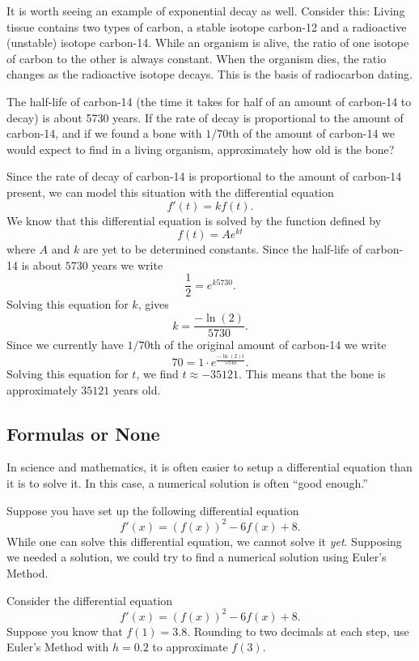 It is worth seeing an example of exponential decay as well. Consider
this: Living tissue contains two types of carbon, a stable
isotope carbon-12 and a radioactive (unstable) isotope
carbon-14. While an organism is alive, the ratio of one isotope of
carbon to the other is always constant. When the organism dies, the
ratio changes as the radioactive isotope decays. This is the basis of
radiocarbon dating.


\begin{example}
The half-life of carbon-14 (the time it takes for half of an amount of
carbon-14 to decay) is about 5730 years. If the rate of decay is
proportional to the amount of carbon-14, and if we found a bone with
$1/70$th of the amount of carbon-14 we would expect to find in a living
organism, approximately how old is the bone?
\end{example}

\begin{solution}
Since the rate of decay of carbon-14 is proportional to the amount of
carbon-14 present, we can model this situation with the differential
equation
\[
f'(t) = k f(t).
\]
We know that this differential equation is solved by the function
defined by
\[
f(t) = A e^{kt}
\]
where $A$ and $k$ are yet to be determined constants. Since the
half-life of carbon-14 is about $5730$ years we write
\[
\frac{1}{2} = e^{k 5730}.
\]
Solving this equation for $k$, gives
\[
k = \frac{-\ln(2)}{5730}.
\]
Since we currently have $1/70$th of the original amount of carbon-14
we write
\[
70 = 1\cdot e^{\frac{-\ln(2)t}{5730}}.
\]
Solving this equation for $t$, we find $t \approx -35121$. This means
that the bone is approximately $35121$ years old.
\end{solution}


\subsection*{Formulas or None}

In science and mathematics, it is often easier to setup a differential
equation than it is to solve it. In this case, a numerical
solution is often ``good enough.''

Suppose you have set up the following differential equation
\[
f'(x) = \left(f(x)\right)^2 - 6f(x) + 8.
\]
While one can solve this differential equation, we cannot solve it
\textit{yet}. Supposing we needed a solution, we could try to find a
numerical solution using Euler's Method.

\begin{example}\label{example:slopefield1}
Consider the differential equation
\[
f'(x) = \left(f(x)\right)^2 - 6f(x) + 8.
\]
Suppose you know that $f(1)= 3.8$. Rounding to two decimals at each
step, use Euler's Method with $h=0.2$ to approximate $f(3)$. 
\end{example}

